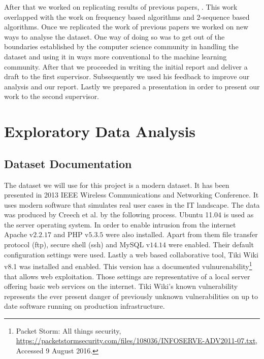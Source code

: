 \documentclass[reqno,openany,12pt]{amsbook}
\begin{document}
After that we worked on replicating results of previous papers\cite{adf1}, \cite{adf2}. This work overlapped with the work on frequency based algorithms and 2-sequence based algorithms. Once we replicated the work of previous papers we worked on new ways to analyse the dataset. One way of doing so was to get out of the boundaries established by the computer science community in handling the dataset and using it in ways more conventional to the machine learning community. After that we proceeded in writing the initial report and deliver a draft to the first supervisor. Subsequently we used his feedback to improve our analysis and our report. Lastly we prepared a presentation in order to present our work to the second supervisor.


\chapter{Exploratory Data Analysis}

\section{Dataset Documentation}

The dataset we will use for this project is a modern dataset. It has been presented in 2013 IEEE Wireless Communications and Networking Conference\cite{dat2}. It uses modern software that simulates real user cases in the IT landscape. The data was produced by Creech et al.\cite{dat2} by the following process. Ubuntu 11.04 is used as the server operating system. In order to enable intrusion from the internet Apache v$2.2.17$ and PHP v$5.3.5$ were also installed.  Apart from them file transfer protocol (ftp), secure shell (ssh) and MySQL v$14.14$ were enabled. Their default configuration settings were used. Lastly a web based collaborative tool, Tiki Wiki v8.1 was installed and enabled. This version has a documented vulnurenability\footnote{Packet Storm: All things security, \url{https://packetstormsecurity.com/files/108036/INFOSERVE-ADV2011-07.txt}, Accessed 9 August 2016.} that allows web exploitation. Those settings are representative of a local server offering basic web services on the internet. Tiki Wiki's known vulnerability represents the ever present danger of previously unknown vulnerabilities on up to date software running on production infrastructure.
\end{document}
